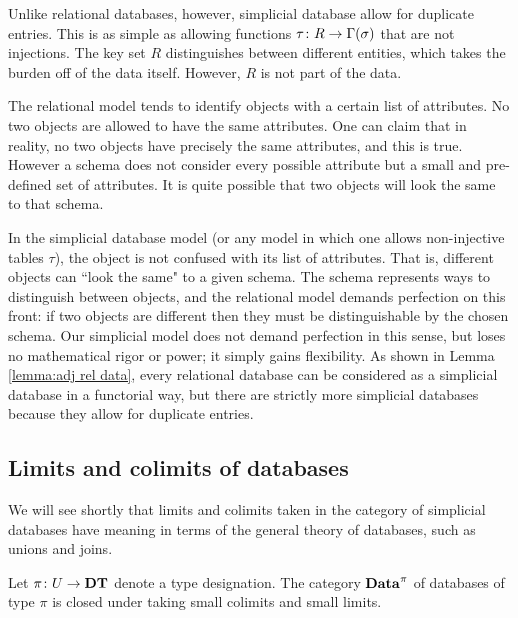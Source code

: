 \documentclass{amsart}
\def\DT{{\bf DT}}
\def\Data{{\bf Data}}
\begin{document}
Unlike relational databases, however, simplicial database allow for duplicate entries.  This is as simple as allowing functions $\tau\colon R\rightarrow\Gamma(\sigma)$ that are not injections.  The key set $R$ distinguishes between different entities, which takes the burden off of the data itself.  However, $R$ is not part of the data.  

The relational model tends to identify objects with a certain list of attributes.  No two objects are allowed to have the same attributes.  One can claim that in reality, no two objects have precisely the same attributes, and this is true.  However a schema does not consider every possible attribute but a small and pre-defined set of attributes.  It is quite possible that two objects will look the same to that schema. 

In the simplicial database model (or any model in which one allows non-injective tables $\tau$), the object is not confused with its list of attributes.  That is, different objects can ``look the same" to a given schema.  The schema represents ways to distinguish between objects, and the relational model demands perfection on this front: if two objects are different then they must be distinguishable by the chosen schema.  Our simplicial model does not demand perfection in this sense, but loses no mathematical rigor or power; it simply gains flexibility.  As shown in Lemma \ref{lemma:adj rel data}, every relational database can be considered as a simplicial database in a functorial way, but there are strictly more simplicial databases because they allow for duplicate entries.

\subsection{Limits and colimits of databases}

We will see shortly that limits and colimits taken in the category of simplicial databases have meaning in terms of the general theory of databases, such as unions and joins.  

\begin{theorem}\label{thm:colimits and limits}

Let $\pi\taking U\to\DT$ denote a type designation.  The category $\Data^\pi$ of databases of type $\pi$ is closed under taking small colimits and small limits.

\end{theorem}
\end{document}
